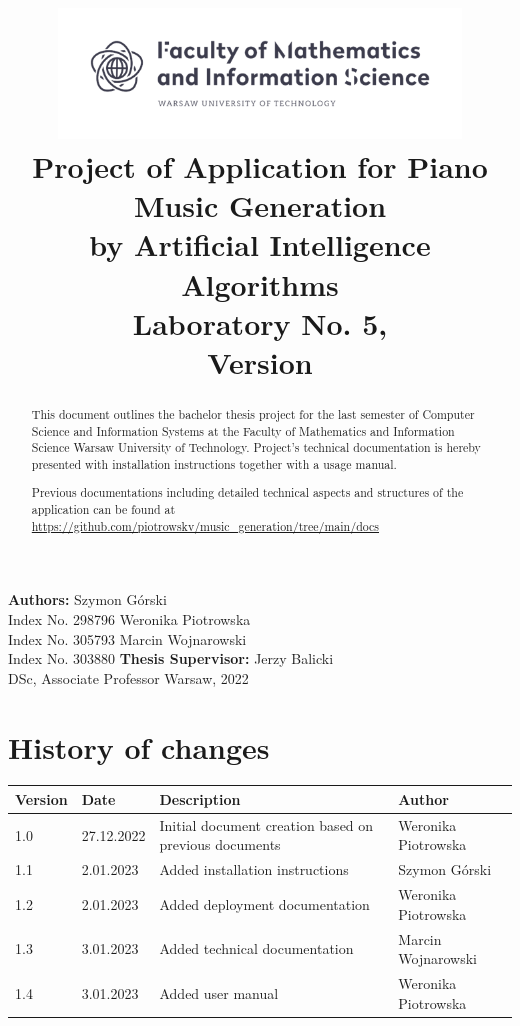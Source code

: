 \documentclass{article}
\title{\includegraphics[width=0.8\textwidth]{MINI.png} \\ Project of Application for Piano Music Generation \\ by Artificial Intelligence Algorithms \\ [0.35em]\large Laboratory No. 5, \\ Version \currentversion }
\author{}
\date{}
\begin{document}
\maketitle
\begin{center}
    \normalsize\textbf{Authors:}
    \vskip10pt
    \Large{Szymon Górski} \\
    \large{Index No. 298796}
    \vskip10pt
    \Large{Weronika Piotrowska} \\
    \large{Index No. 305793}
    \vskip10pt
    \Large{Marcin Wojnarowski} \\
    \large{Index No. 303880}
    \vskip50pt
    \normalsize\textbf{Thesis Supervisor:}
    \vskip10pt
    \Large{Jerzy Balicki} \\
    \large{DSc, Associate Professor}
    \vfill
    \large{Warsaw, 2022}
\end{center}

\newpage
\begin{abstract}
    This document outlines the bachelor thesis project for the last semester of Computer Science and Information Systems at the Faculty of Mathematics and Information Science Warsaw University of Technology. Project's technical documentation is hereby presented with installation instructions together with a usage manual.

    \hfill

    Previous documentations including detailed technical aspects and structures of the application can be found at \href{https://github.com/piotrowskv/music_generation/tree/main/docs}{https://github.com/piotrowskv/music\_generation/tree/main/docs} \label{previous_docs}
\end{abstract}

\vskip50pt
\section*{History of changes}
\begin{center}
    \begin{tabular}{ |p{} | p{} | p{} | p{}| }
        \hline
        Version & Date       & Description                                           & Author              \\
        \hline
        1.0     & 27.12.2022 & Initial document creation based on previous documents & Weronika Piotrowska \\
        \hline
        1.1     & 2.01.2023  & Added installation instructions                       & Szymon Górski       \\
        \hline
        1.2     & 2.01.2023  & Added deployment documentation                        & Weronika Piotrowska \\
        \hline
        1.3     & 3.01.2023  & Added technical documentation                         & Marcin Wojnarowski  \\
        \hline
        1.4     & 3.01.2023  & Added user manual                                     & Weronika Piotrowska \\
        \hline
    \end{tabular}
\end{center}
\end{document}
